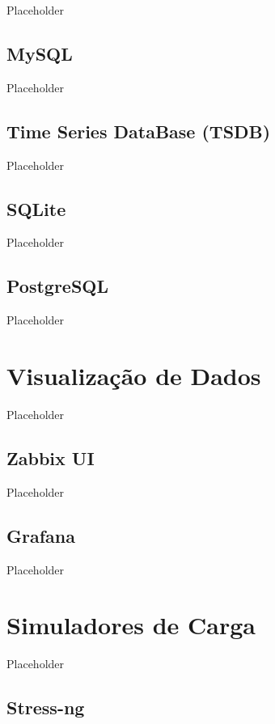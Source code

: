 Placeholder

\subsection{MySQL}
\label{subsection:MySQL}

Placeholder

\subsection{Time Series DataBase (TSDB)}
\label{subsection:TSDB}

Placeholder

\subsection{SQLite}
\label{subsection:SQLite}

Placeholder

\subsection{PostgreSQL}
\label{subsection:PostgreSQL}

Placeholder

\section{Visualização de Dados}
\label{section:VisualizacaoDados}

Placeholder

\subsection{Zabbix UI}
\label{subsection:ZabbixUI}

Placeholder

\subsection{Grafana}
\label{subsection:Grafana}

Placeholder

\section{Simuladores de Carga}
\label{section:SimuladoresCarga}

Placeholder

\subsection{Stress-ng}
\label{subsection:StressNG}

